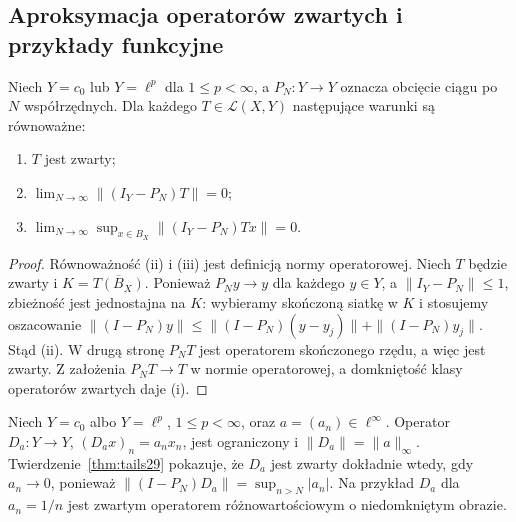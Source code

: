 \subsection{Aproksymacja operatorów zwartych i przykłady funkcyjne}

\begin{twierdzenie}
\label{thm:tails29}
Niech $Y=c_0$ lub $Y=\ell^p$ dla $1\le p<\infty$,
a $P_N:Y\to Y$ oznacza obcięcie ciągu po $N$ współrzędnych.
Dla każdego $T\in\mathcal L(X,Y)$ następujące warunki są
równoważne:
\begin{enumerate}[label=\textup{(\roman*)}]
\item $T$ jest zwarty;
\item $\lim_{N\to\infty}\|(I_Y-P_N)T\|=0$;
\item $\lim_{N\to\infty}\sup_{x\in B_X}
      \|(I_Y-P_N)Tx\|=0$.
\end{enumerate}
\end{twierdzenie}
\begin{proof}
Równoważność (ii) i (iii) jest definicją normy operatorowej.
Niech $T$ będzie zwarty i $K=\overline{T(B_X)}$.
Ponieważ $P_Ny\to y$ dla każdego $y\in Y$, a
$\|I_Y-P_N\|\le1$, zbieżność jest jednostajna na $K$:
wybieramy skończoną siatkę w $K$ i stosujemy oszacowanie
$\|(I-P_N)y\|\le\|(I-P_N)(y-y_j)\|+
\|(I-P_N)y_j\|$. Stąd (ii).
W drugą stronę $P_NT$ jest operatorem skończonego rzędu,
a więc jest zwarty. Z założenia $P_NT\to T$ w normie
operatorowej, a domkniętość klasy operatorów zwartych
daje (i).
\end{proof}

\begin{przyklad}
\label{ex:diagonal29}
Niech $Y=c_0$ albo $Y=\ell^p$, $1\le p<\infty$,
oraz $a=(a_n)\in\ell^\infty$. Operator
$D_a:Y\to Y$, $(D_ax)_n=a_nx_n$, jest ograniczony
i $\|D_a\|=\|a\|_\infty$. Twierdzenie~\ref{thm:tails29}
pokazuje, że $D_a$ jest zwarty dokładnie wtedy, gdy
$a_n\to0$, ponieważ
$\|(I-P_N)D_a\|=\sup_{n>N}|a_n|$.
Na przykład $D_a$ dla $a_n=1/n$ jest zwartym
operatorem różnowartościowym o niedomkniętym obrazie.
\end{przyklad}

